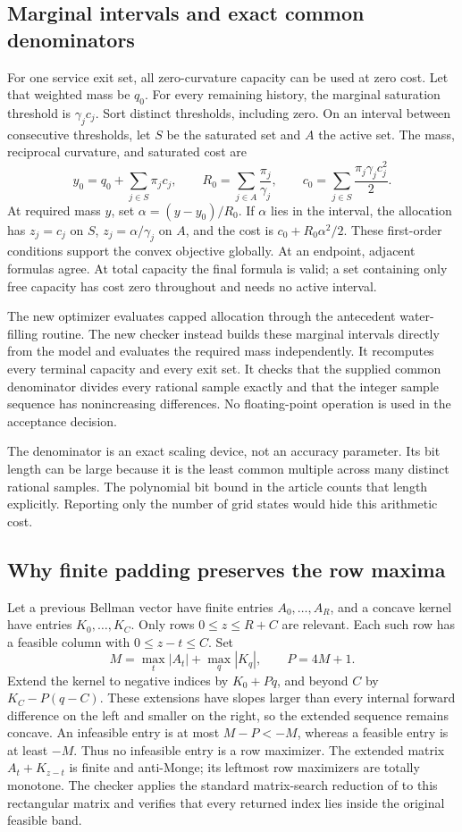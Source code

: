 \subsection{Marginal intervals and exact common denominators}
For one service exit set, all zero-curvature capacity can be used at zero cost. Let that weighted mass be $q_0$. For every remaining history, the marginal saturation threshold is $\gamma_jc_j$. Sort distinct thresholds, including zero. On an interval between consecutive thresholds, let $S$ be the saturated set and $A$ the active set. The mass, reciprocal curvature, and saturated cost are
\[
 y_0=q_0+\sum_{j\in S}\pi_jc_j,\qquad R_0=\sum_{j\in A}\frac{\pi_j}{\gamma_j},\qquad c_0=\sum_{j\in S}\frac{\pi_j\gamma_jc_j^2}{2}.
\]
At required mass $y$, set $\alpha=(y-y_0)/R_0$. If $\alpha$ lies in the interval, the allocation has $z_j=c_j$ on $S$, $z_j=\alpha/\gamma_j$ on $A$, and the cost is $c_0+R_0\alpha^2/2$. These first-order conditions support the convex objective globally. At an endpoint, adjacent formulas agree. At total capacity the final formula is valid; a set containing only free capacity has cost zero throughout and needs no active interval.

The new optimizer evaluates capped allocation through the antecedent water-filling routine. The new checker instead builds these marginal intervals directly from the model and evaluates the required mass independently. It recomputes every terminal capacity and every exit set. It checks that the supplied common denominator divides every rational sample exactly and that the integer sample sequence has nonincreasing differences. No floating-point operation is used in the acceptance decision.

The denominator is an exact scaling device, not an accuracy parameter. Its bit length can be large because it is the least common multiple across many distinct rational samples. The polynomial bit bound in the article counts that length explicitly. Reporting only the number of grid states would hide this arithmetic cost.

\subsection{Why finite padding preserves the row maxima}
Let a previous Bellman vector have finite entries $A_0,\ldots,A_R$, and a concave kernel have entries $K_0,\ldots,K_C$. Only rows $0\leq z\leq R+C$ are relevant. Each such row has a feasible column with $0\leq z-t\leq C$. Set
\[
 M=\max_t|A_t|+\max_q|K_q|,\qquad P=4M+1.
\]
Extend the kernel to negative indices by $K_0+Pq$, and beyond $C$ by $K_C-P(q-C)$. These extensions have slopes larger than every internal forward difference on the left and smaller on the right, so the extended sequence remains concave. An infeasible entry is at most $M-P<-M$, whereas a feasible entry is at least $-M$. Thus no infeasible entry is a row maximizer. The extended matrix $A_t+K_{z-t}$ is finite and anti-Monge; its leftmost row maximizers are totally monotone. The checker applies the standard matrix-search reduction of \citet{Aggarwal1987} to this rectangular matrix and verifies that every returned index lies inside the original feasible band.

